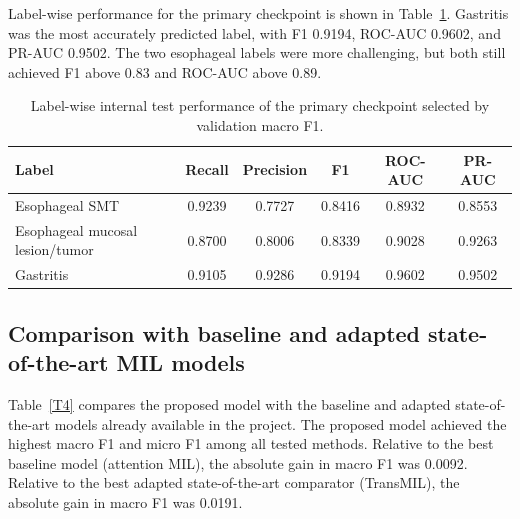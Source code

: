 \documentclass[Afour,sagev,times]{sagej}
\begin{document}
Label-wise performance for the primary checkpoint is shown in Table~\ref{T3}. Gastritis was the most accurately predicted label, with F1 0.9194, ROC-AUC 0.9602, and PR-AUC 0.9502. The two esophageal labels were more challenging, but both still achieved F1 above 0.83 and ROC-AUC above 0.89.

\begin{table}[t]
\footnotesize\sf\centering
\caption{Label-wise internal test performance of the primary checkpoint selected by validation macro F1.\label{T3}}
\begin{tabular}{p{}ccccc}
\toprule
Label & Recall & Precision & F1 & ROC-AUC & PR-AUC \\
\midrule
Esophageal SMT & 0.9239 & 0.7727 & 0.8416 & 0.8932 & 0.8553 \\
Esophageal mucosal lesion/tumor & 0.8700 & 0.8006 & 0.8339 & 0.9028 & 0.9263 \\
Gastritis & 0.9105 & 0.9286 & 0.9194 & 0.9602 & 0.9502 \\
\bottomrule
\end{tabular}
\end{table}

\subsection{Comparison with baseline and adapted state-of-the-art MIL models}
Table~\ref{T4} compares the proposed model with the baseline and adapted state-of-the-art models already available in the project. The proposed model achieved the highest macro F1 and micro F1 among all tested methods. Relative to the best baseline model (attention MIL), the absolute gain in macro F1 was 0.0092. Relative to the best adapted state-of-the-art comparator (TransMIL), the absolute gain in macro F1 was 0.0191.
\end{document}
